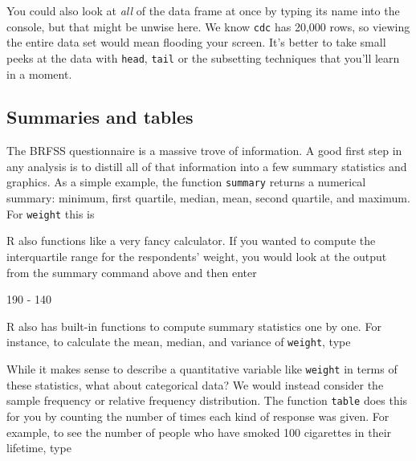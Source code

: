 \documentclass[]{article}
\newenvironment{Shaded}{\begin{snugshade}}{\end{snugshade}}
\newcommand{\KeywordTok}[1]{\textcolor[rgb]{0.13,0.29,0.53}{\textbf{{#1}}}}
\newcommand{\DecValTok}[1]{\textcolor[rgb]{0.00,0.00,0.81}{{#1}}}
\newcommand{\StringTok}[1]{\textcolor[rgb]{0.31,0.60,0.02}{{#1}}}
\newcommand{\NormalTok}[1]{{#1}}
\begin{document}
You could also look at \emph{all} of the data frame at once by typing
its name into the console, but that might be unwise here. We know
\texttt{cdc} has 20,000 rows, so viewing the entire data set would mean
flooding your screen. It's better to take small peeks at the data with
\texttt{head}, \texttt{tail} or the subsetting techniques that you'll
learn in a moment.

\subsection{Summaries and tables}\label{summaries-and-tables}

The BRFSS questionnaire is a massive trove of information. A good first
step in any analysis is to distill all of that information into a few
summary statistics and graphics. As a simple example, the function
\texttt{summary} returns a numerical summary: minimum, first quartile,
median, mean, second quartile, and maximum. For \texttt{weight} this is

\begin{Shaded}
\end{Shaded}

R also functions like a very fancy calculator. If you wanted to compute
the interquartile range for the respondents' weight, you would look at
the output from the summary command above and then enter

\begin{Shaded}
\begin{Highlighting}[]
\DecValTok{190} \NormalTok{-}\StringTok{ }\DecValTok{140}
\end{Highlighting}
\end{Shaded}

R also has built-in functions to compute summary statistics one by one.
For instance, to calculate the mean, median, and variance of
\texttt{weight}, type

\begin{Shaded}
\end{Shaded}

While it makes sense to describe a quantitative variable like
\texttt{weight} in terms of these statistics, what about categorical
data? We would instead consider the sample frequency or relative
frequency distribution. The function \texttt{table} does this for you by
counting the number of times each kind of response was given. For
example, to see the number of people who have smoked 100 cigarettes in
their lifetime, type
\end{document}
